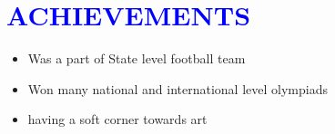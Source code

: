 \documentclass{article}
\begin{document}
\vspace{3pt}

\section*{\large{\textcolor{blue}{\uppercase{achievements}}}}

\vspace{4pt}
\begin{itemize}[noitemsep,nolistsep]
	\item Was a part of State level football team
	\item Won many national and international level olympiads
	\item having a soft corner towards art
\end{itemize}
 

\vspace{3pt}
\end{document}
